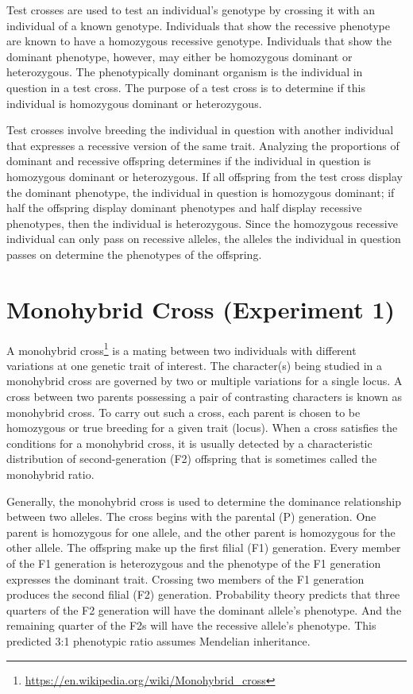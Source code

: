 \documentclass[]{book}
\let\rmarkdownfootnote\footnote%
\def\footnote{\protect\rmarkdownfootnote}
\renewcommand{\href}[2]{#2\footnote{\url{#1}}}
\theoremstyle{definition}
\theoremstyle{definition}
\theoremstyle{definition}
\theoremstyle{remark}
\begin{document}
Test crosses are used to test an individual's genotype by crossing it
with an individual of a known genotype. Individuals that show the
recessive phenotype are known to have a homozygous recessive genotype.
Individuals that show the dominant phenotype, however, may either be
homozygous dominant or heterozygous. The phenotypically dominant
organism is the individual in question in a test cross. The purpose of a
test cross is to determine if this individual is homozygous dominant or
heterozygous.

Test crosses involve breeding the individual in question with another
individual that expresses a recessive version of the same trait.
Analyzing the proportions of dominant and recessive offspring determines
if the individual in question is homozygous dominant or heterozygous. If
all offspring from the test cross display the dominant phenotype, the
individual in question is homozygous dominant; if half the offspring
display dominant phenotypes and half display recessive phenotypes, then
the individual is heterozygous. Since the homozygous recessive
individual can only pass on recessive alleles, the alleles the
individual in question passes on determine the phenotypes of the
offspring.

\section{Monohybrid Cross (Experiment
1)}\label{monohybrid-cross-experiment-1}

A \href{https://en.wikipedia.org/wiki/Monohybrid_cross}{monohybrid
cross} is a mating between two individuals with different variations at
one genetic trait of interest. The character(s) being studied in a
monohybrid cross are governed by two or multiple variations for a single
locus. A cross between two parents possessing a pair of contrasting
characters is known as monohybrid cross. To carry out such a cross, each
parent is chosen to be homozygous or true breeding for a given trait
(locus). When a cross satisfies the conditions for a monohybrid cross,
it is usually detected by a characteristic distribution of
second-generation (F2) offspring that is sometimes called the monohybrid
ratio.

Generally, the monohybrid cross is used to determine the dominance
relationship between two alleles. The cross begins with the parental (P)
generation. One parent is homozygous for one allele, and the other
parent is homozygous for the other allele. The offspring make up the
first filial (F1) generation. Every member of the F1 generation is
heterozygous and the phenotype of the F1 generation expresses the
dominant trait. Crossing two members of the F1 generation produces the
second filial (F2) generation. Probability theory predicts that three
quarters of the F2 generation will have the dominant allele's phenotype.
And the remaining quarter of the F2s will have the recessive allele's
phenotype. This predicted 3:1 phenotypic ratio assumes Mendelian
inheritance.
\end{document}
